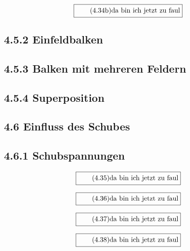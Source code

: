 \documentclass[11pt]{article}
\newcommand{\1}{ {\mathds{1}} }
\begin{document}
    \begin{equation}
      \boxed{
        \tag{4.34b}
        \begin{split}
          \text{da bin ich jetzt zu faul}
        \end{split}
      }
    \end{equation}
    
    \subsection*{4.5.2 Einfeldbalken} 
    \subsection*{4.5.3 Balken mit mehreren Feldern}
    \subsection*{4.5.4 Superposition}
    \subsection*{4.6 Einfluss des Schubes}
    \subsection*{4.6.1 Schubspannungen}

    \begin{equation}
      \boxed{
        \tag{4.35}
        \begin{split}
          \text{da bin ich jetzt zu faul}
        \end{split}
      }
    \end{equation}

    \begin{equation}
      \boxed{
        \tag{4.36}
        \begin{split}
          \text{da bin ich jetzt zu faul}
        \end{split}
      }
    \end{equation}

    \begin{equation}
      \boxed{
        \tag{4.37}
        \begin{split}
          \text{da bin ich jetzt zu faul}
        \end{split}
      }
    \end{equation}

    \begin{equation}
      \boxed{
        \tag{4.38}
        \begin{split}
          \text{da bin ich jetzt zu faul}
        \end{split}
      }
    \end{equation}
\end{document}
